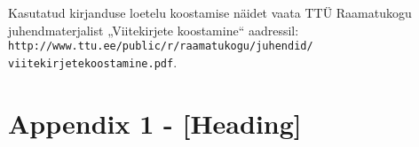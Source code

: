 \documentclass[12pt]{article} %
\begin{document}
Kasutatud kirjanduse loetelu koostamise näidet vaata TTÜ Raamatukogu juhendmaterjalist „Viitekirjete koostamine“ aadressil: \texttt{http://www.ttu.ee/public/r/raamatukogu/juhendid/
viitekirjetekoostamine.pdf}.

\pagebreak

\section*{Appendix 1 - [Heading]}

\end{document}

